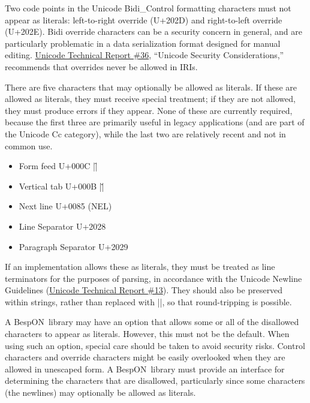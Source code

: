 \documentclass[11pt]{article}
\newcommand{\bespon}{BespON}
\begin{document}
Two code points in the Unicode Bidi\_Control formatting characters must not appear as literals:  left-to-right override (U+202D) and right-to-left override (U+202E).   Bidi override characters can be a security concern in general, and are particularly problematic in a data serialization format designed for manual editing.  \href{http://unicode.org/reports/tr36/}{Unicode Technical Report \#36}, ``Unicode Security Considerations,'' recommends that overrides never be allowed in IRIs.

There are five characters that may optionally be allowed as literals.  If these are allowed as literals, they must receive special treatment; if they are not allowed, they must produce errors if they appear.  None of these are currently required, because the first three are primarily useful in legacy applications (and are part of the Unicode Cc category), while the last two are relatively recent and not in common use.
\begin{itemize}
\item Form feed U+000C |\f|
\item Vertical tab U+000B |\v|
\item Next line U+0085 (NEL)
\item Line Separator U+2028
\item Paragraph Separator U+2029
\end{itemize}
If an implementation allows these as literals, they must be treated as line terminators for the purposes of parsing, in accordance with the Unicode Newline Guidelines (\href{http://unicode.org/standard/reports/tr13/tr13-5.html}{Unicode Technical Report \#13}).  They should also be preserved within strings, rather than replaced with |\n|, so that round-tripping is possible.

A \bespon\ library may have an option that allows some or all of the disallowed characters to appear as literals.  However, this must not be the default.  When using such an option, special care should be taken to avoid security risks.  Control characters and override characters might be easily overlooked when they are allowed in unescaped form.  A \bespon\ library must provide an interface for determining the characters that are disallowed, particularly since some characters (the newlines) may optionally be allowed as literals.
\end{document}

